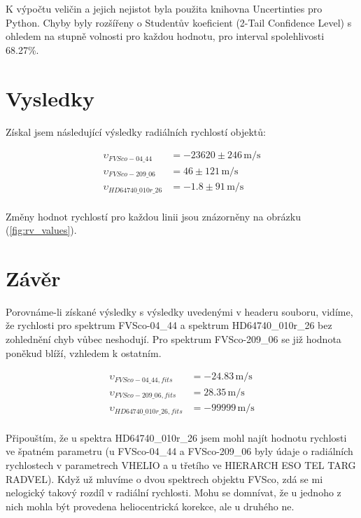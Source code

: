 \documentclass[a4paper,11pt,twocolumn]{article}
\begin{document}
        K výpočtu veličin a jejich nejistot byla použita knihovna Uncertinties pro Python. Chyby byly rozšířeny o Studentův koeficient (2-Tail Confidence Level) s ohledem na stupně volnosti pro každou hodnotu, pro interval spolehlivosti 68.27\%.

    \section{Vysledky}
        Získal jsem následující výsledky radiálních rychlostí objektů: 

        \begin{equation*}
            \begin{split}
                \upsilon_{FVSco-04\_44} &= -23620 \pm 246 \, \si{\meter\per\second} \\
                \upsilon_{FVSco-209\_06} &= 46 \pm 121 \, \si{\meter\per\second} \\
                \upsilon_{HD64740\_010r\_26} &= -1.8 \pm 91 \, \si{\meter\per\second} \\
            \end{split}
        \end{equation*}

        Změny hodnot rychlostí pro každou linii jsou znázorněny na obrázku (\ref{fig:rv_values}).

        
    \section{Závěr}
        Porovnáme-li získané výsledky s výsledky uvedenými v headeru souboru, vidíme, že rychlosti pro spektrum FVSco-04\_44 a spektrum HD64740\_010r\_26 bez zohlednění chyb vůbec neshodují. Pro spektrum FVSco-209\_06 se již hodnota poněkud blíží, vzhledem k ostatním.
        
        \begin{equation*}
            \begin{split}
                \upsilon_{FVSco-04\_44, fits} &= -24.83 \, \si{\meter\per\second} \\
                \upsilon_{FVSco-209\_06, fits} &= 28.35 \, \si{\meter\per\second} \\
                \upsilon_{HD64740\_010r\_26, fits} &= -99999 \, \si{\meter\per\second} \\
            \end{split}
        \end{equation*}

        Připouštím, že u spektra HD64740\_010r\_26 jsem mohl najít hodnotu rychlosti ve špatném parametru (u FVSco-04\_44 a FVSco-209\_06 byly údaje o radiálních rychlostech v parametrech VHELIO a u třetího ve HIERARCH ESO TEL TARG RADVEL). 
        Když už mluvíme o dvou spektrech objektu FVSco, zdá se mi nelogický takový rozdíl v radiální rychlosti. Mohu se domnívat, že u jednoho z nich mohla být provedena heliocentrická korekce, ale u druhého ne. 
\end{document}

